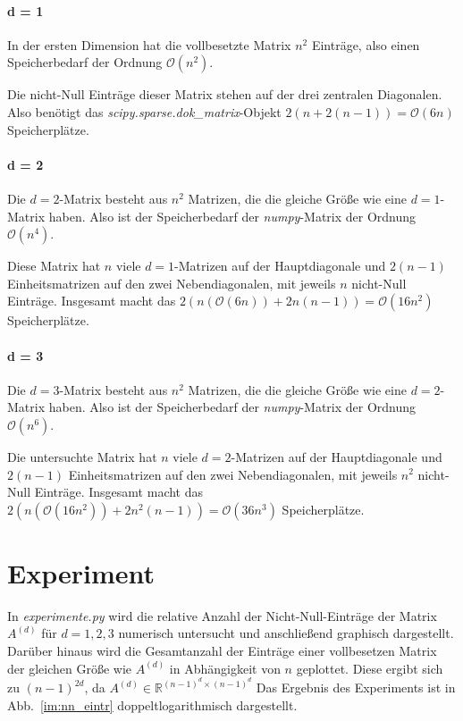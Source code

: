 \documentclass[smallheadings]{scrartcl}
\begin{document}
\paragraph{d = 1}
In der ersten Dimension hat die vollbesetzte Matrix $n^2$ Einträge, also einen Speicherbedarf der Ordnung $\mathcal{O}(n^2)$.

Die nicht-Null Einträge dieser Matrix stehen auf der drei zentralen Diagonalen. Also benötigt das \textit{scipy.sparse.dok\_matrix}-Objekt $2(n+2(n-1)) = \mathcal{O}(6n)$ Speicherplätze.

\paragraph{d = 2}
Die $d=2$-Matrix besteht aus $n^2$ Matrizen, die die gleiche Größe wie eine $d=1$-Matrix haben. Also ist der Speicherbedarf der \textit{numpy}-Matrix der Ordnung $\mathcal{O}(n^4)$.

 Diese Matrix hat $n$ viele $d=1$-Matrizen auf der Hauptdiagonale  und $2(n-1)$ Einheitsmatrizen auf den zwei Nebendiagonalen, mit jeweils $n$ nicht-Null Einträge. Insgesamt macht das $2(n(\mathcal{O}(6n))+2n(n-1))=\mathcal{O}(16n^2)$ Speicherplätze.
 
 \paragraph{d = 3}
 Die $d=3$-Matrix besteht aus $n^2$ Matrizen, die die gleiche Größe wie eine $d=2$-Matrix haben. Also ist der Speicherbedarf der \textit{numpy}-Matrix der Ordnung $\mathcal{O}(n^6)$.
 
 Die untersuchte Matrix hat $n$ viele $d=2$-Matrizen auf der Hauptdiagonale  und $2(n-1)$ Einheitsmatrizen auf den zwei Nebendiagonalen, mit jeweils $n^2$ nicht-Null Einträge. Insgesamt macht das $2(n(\mathcal{O}(16n^2))+2n^2(n-1))=\mathcal{O}(36n^3)$ Speicherplätze.

\section{Experiment}

In \textit{experimente.py} wird die relative Anzahl der Nicht-Null-Einträge der Matrix $A^{(d)}$ für $d=1,2,3$ numerisch untersucht und anschließend graphisch dargestellt. Darüber hinaus wird die Gesamtanzahl der Einträge einer vollbesetzen Matrix der gleichen Größe wie $A^{(d)}$ in Abhängigkeit von $n$ geplottet. Diese ergibt sich zu $(n-1)^{2d}$, da $A^{(d)}\in\mathbb{R}^{(n-1)^d\times(n-1)^d}$ Das Ergebnis des Experiments ist in Abb.~\ref{im:nn_eintr} doppeltlogarithmisch dargestellt.
\end{document}
